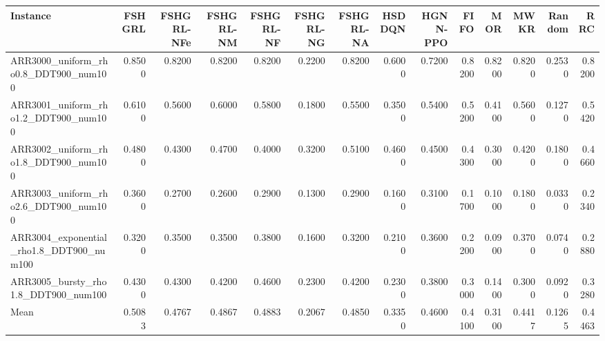 \begin{tabular}{lrrrrrrrrrrrrr}
\toprule
Instance & FSHGRL & FSHGRL-NFe & FSHGRL-NM & FSHGRL-NF & FSHGRL-NG & FSHGRL-NA & HSDDQN & HGNN-PPO & FIFO & MOR & MWKR & Random & RRC \\
\midrule
ARR3000\_uniform\_rho0.8\_DDT900\_num100 & 0.8500 & 0.8200 & 0.8200 & 0.8200 & 0.2200 & 0.8200 & 0.6000 & 0.7200 & 0.8200 & 0.8200 & 0.8200 & 0.2530 & 0.8200 \\
ARR3001\_uniform\_rho1.2\_DDT900\_num100 & 0.6100 & 0.5600 & 0.6000 & 0.5800 & 0.1800 & 0.5500 & 0.3500 & 0.5400 & 0.5200 & 0.4100 & 0.5600 & 0.1270 & 0.5420 \\
ARR3002\_uniform\_rho1.8\_DDT900\_num100 & 0.4800 & 0.4300 & 0.4700 & 0.4000 & 0.3200 & 0.5100 & 0.4600 & 0.4500 & 0.4300 & 0.3000 & 0.4200 & 0.1800 & 0.4660 \\
ARR3003\_uniform\_rho2.6\_DDT900\_num100 & 0.3600 & 0.2700 & 0.2600 & 0.2900 & 0.1300 & 0.2900 & 0.1600 & 0.3100 & 0.1700 & 0.1000 & 0.1800 & 0.0330 & 0.2340 \\
ARR3004\_exponential\_rho1.8\_DDT900\_num100 & 0.3200 & 0.3500 & 0.3500 & 0.3800 & 0.1600 & 0.3200 & 0.2100 & 0.3600 & 0.2200 & 0.0900 & 0.3700 & 0.0740 & 0.2880 \\
ARR3005\_bursty\_rho1.8\_DDT900\_num100 & 0.4300 & 0.4300 & 0.4200 & 0.4600 & 0.2300 & 0.4200 & 0.2300 & 0.3800 & 0.3000 & 0.1400 & 0.3000 & 0.0920 & 0.3280 \\
Mean & 0.5083 & 0.4767 & 0.4867 & 0.4883 & 0.2067 & 0.4850 & 0.3350 & 0.4600 & 0.4100 & 0.3100 & 0.4417 & 0.1265 & 0.4463 \\
\bottomrule
\end{tabular}
